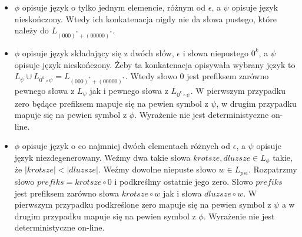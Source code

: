 \documentclass[a4paper]{article}
\begin{document}
\begin{enumerate}
\begin{itemize}
    \item $\phi$ opisuje język o tylko jednym elemencie, różnym od $\epsilon$, a $\psi$ opisuje język nieskończony. Wtedy ich konkatenacja nigdy nie da słowa pustego, które należy do $L_{(000)^* + (00000)^*}$.
    \item $\phi$ opisuje język składający się z dwóch słów, $\epsilon$ i słowa niepustego $0^k$, a $\psi$ opisuje język nieskończony. Żeby ta konkatenacja opisywała wybrany język to $L_{\psi} \cup L_{0^k \circ \psi} = L_{(000)^* + (00000)^*}$. Wtedy słowo $0$ jest prefiksem zarówno pewnego słowa z $L_{\psi}$ jak i pewnego słowa z $L_{0^k \circ \psi}$. W pierwszym przypadku zero będące prefiksem mapuje się na pewien symbol z $\psi$, w drugim przypadku mapuje się na pewien symbol z $\phi$. Wyrażenie nie jest deterministyczne on-line.

    \item $\phi$ opisuje język o co najmniej dwóch elementach różnych od $\epsilon$, a $\psi$ opisuje język niezdegenerowany. Weźmy dwa takie słowa $krotsze, dluzsze \in L_{\phi}$ takie, że $|krotsze| < |dluzsze|$. Weźmy dowolne niepuste słowo $w \in L_{psi}$. Rozpatrzmy słowo $prefiks = krotsze \circ 0$ i podkreślmy ostatnie jego zero. Słowo $prefiks$ jest prefiksem zarówno słowa $krotsze \circ w$ jak i słowa $dluzsze \circ w$. W pierwszym przypadku podkreślone zero mapuje się na pewien symbol z $\psi$ a w drugim przypadku mapuje się na pewien symbol z $\phi$. Wyrażenie nie jest deterministyczne on-line.
  \end{itemize}
\end{enumerate}
\end{document}
